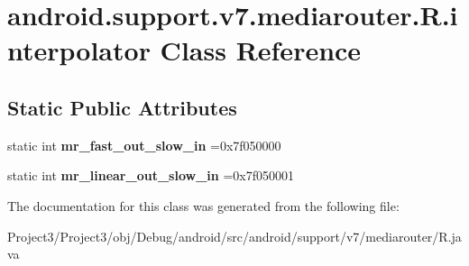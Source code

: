\hypertarget{classandroid_1_1support_1_1v7_1_1mediarouter_1_1R_1_1interpolator}{}\section{android.\+support.\+v7.\+mediarouter.\+R.\+interpolator Class Reference}
\label{classandroid_1_1support_1_1v7_1_1mediarouter_1_1R_1_1interpolator}
\subsection*{Static Public Attributes}
\begin{DoxyCompactItemize}
\item 
\mbox{\label{classandroid_1_1support_1_1v7_1_1mediarouter_1_1R_1_1interpolator_a9d85b47fdeddfa60e840b73bc5659472}} 
static int {\bfseries mr\+\_\+fast\+\_\+out\+\_\+slow\+\_\+in} =0x7f050000
\item 
\mbox{\label{classandroid_1_1support_1_1v7_1_1mediarouter_1_1R_1_1interpolator_a0780a93935c782073922d4f8f92fd849}} 
static int {\bfseries mr\+\_\+linear\+\_\+out\+\_\+slow\+\_\+in} =0x7f050001
\end{DoxyCompactItemize}


The documentation for this class was generated from the following file\+:\begin{DoxyCompactItemize}
\item 
Project3/\+Project3/obj/\+Debug/android/src/android/support/v7/mediarouter/R.\+java\end{DoxyCompactItemize}
